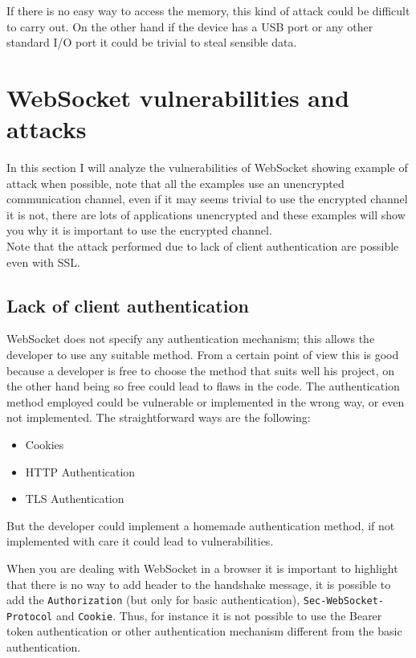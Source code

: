 	If there is no easy way to access the memory, this kind of attack could be difficult to carry out.
	On the other hand if the device has a USB port or any other standard I/O port it could be trivial to steal sensible data.
	
	
	\section{WebSocket vulnerabilities and attacks}
	In this section I will analyze the vulnerabilities of WebSocket showing example of attack when possible, note that
	all the examples use an unencrypted communication channel, even if it may seems trivial to use the encrypted channel
	it is not, there are lots of applications unencrypted and these examples will show you why it is important to use
	the encrypted channel.\\
	Note that the attack performed due to lack of client authentication are possible even with SSL.
	
	
	\subsection{Lack of client authentication}\label{sssec:lack}
	WebSocket does not specify any authentication mechanism; this allows the developer to use any suitable method.
	From a certain point of view this is good because a developer is free to choose the method that suits well his project, on the other hand being so free could lead to flaws in the code.\newline
	The authentication method employed could be vulnerable or implemented in the wrong way, or even not implemented.\newline
	The straightforward ways are the following:
	\begin{itemize}
		\item Cookies
		\item HTTP Authentication
		\item TLS Authentication
	\end{itemize}

	But the developer could implement a homemade authentication method, if not implemented with care it could lead to vulnerabilities.\newline
	
	When you are dealing with WebSocket in a browser it is important to highlight that there is no way to add header to the handshake message, it is possible to add the \texttt{Authorization} (but only for basic authentication), \texttt{Sec-WebSocket-Protocol} and \texttt{Cookie}.\newline
	Thus, for instance it is not possible to use the Bearer token authentication or other authentication mechanism different from the basic authentication.\newline
	
